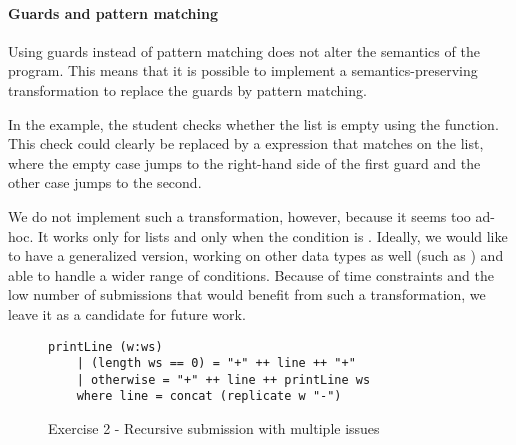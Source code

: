 
\paragraph{Guards and pattern matching}

Using guards instead of pattern matching does not alter the semantics of the program. This means that it is possible to implement a semantics-preserving transformation to replace the guards by pattern matching.

In the example, the student checks whether the list is empty using the  function. This check could clearly be replaced by a  expression that matches on the list, where the empty case jumps to the right-hand side of the first guard and the other case jumps to the second.

We do not implement such a transformation, however, because it seems too ad-hoc. It works only for lists and only when the condition is . Ideally, we would like to have a generalized version, working on other data types as well (such as ) and able to handle a wider range of conditions. Because of time constraints and the low number of submissions that would benefit from such a transformation, we leave it as a candidate for future work.



\begin{figure}
\begin{verbatim}
printLine (w:ws)
    | (length ws == 0) = "+" ++ line ++ "+"
    | otherwise = "+" ++ line ++ printLine ws
    where line = concat (replicate w "-")
\end{verbatim}
\caption{Exercise 2 - Recursive submission with multiple issues}
\label{fig:ex2-reimplementation-map-guards}
\end{figure}



